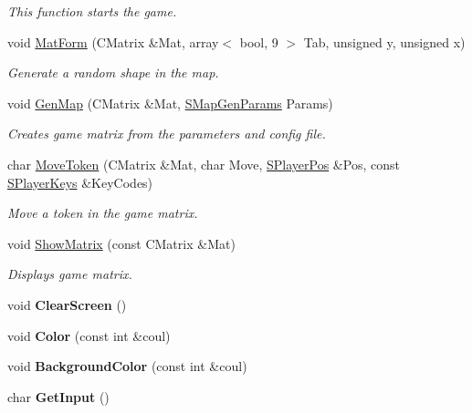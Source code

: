 \begin{DoxyCompactItemize}
\begin{DoxyCompactList}\small\item\em This function starts the game. \end{DoxyCompactList}\item 
void \hyperlink{namespace_chase_game_aa29dad756d93bb9f091073fcd5eab908}{Mat\-Form} (C\-Matrix \&Mat, array$<$ bool, 9 $>$ Tab, unsigned y, unsigned x)
\begin{DoxyCompactList}\small\item\em Generate a random shape in the map. \end{DoxyCompactList}\item 
void \hyperlink{namespace_chase_game_adfaa7677a16626893e1fb0739e50e7c6}{Gen\-Map} (C\-Matrix \&Mat, \hyperlink{struct_chase_game_1_1_s_map_gen_params}{S\-Map\-Gen\-Params} Params)
\begin{DoxyCompactList}\small\item\em Creates game matrix from the parameters and config file. \end{DoxyCompactList}\item 
char \hyperlink{namespace_chase_game_a1b0d964656a1a14bacc9f316a78c0d46}{Move\-Token} (C\-Matrix \&Mat, char Move, \hyperlink{struct_chase_game_1_1_s_player_pos}{S\-Player\-Pos} \&Pos, const \hyperlink{struct_chase_game_1_1_s_player_keys}{S\-Player\-Keys} \&Key\-Codes)
\begin{DoxyCompactList}\small\item\em Move a token in the game matrix. \end{DoxyCompactList}\item 
void \hyperlink{namespace_chase_game_a22a6493962ff9e0343c1f68fb0fa7956}{Show\-Matrix} (const C\-Matrix \&Mat)
\begin{DoxyCompactList}\small\item\em Displays game matrix. \end{DoxyCompactList}\item 
\hypertarget{namespace_chase_game_a3a7382465f6f23fe77cde4e589fb80d6}{void {\bfseries Clear\-Screen} ()}\label{namespace_chase_game_a3a7382465f6f23fe77cde4e589fb80d6}

\item 
\hypertarget{namespace_chase_game_a81083415570296b1021ca83364e61759}{void {\bfseries Color} (const int \&coul)}\label{namespace_chase_game_a81083415570296b1021ca83364e61759}

\item 
\hypertarget{namespace_chase_game_a5e628c83ea3d70df1a49dd2906a43ecc}{void {\bfseries Background\-Color} (const int \&coul)}\label{namespace_chase_game_a5e628c83ea3d70df1a49dd2906a43ecc}

\item 
\hypertarget{namespace_chase_game_afa8eec677de5433e0e886da19f7e9c4a}{char {\bfseries Get\-Input} ()}\label{namespace_chase_game_afa8eec677de5433e0e886da19f7e9c4a}

\end{DoxyCompactItemize}
